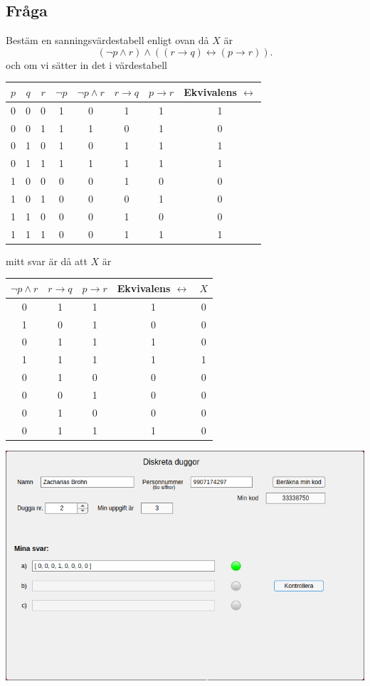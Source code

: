 \documentclass[a4paper,12pt]{article}
\begin{document}
\subsection*{Fråga}
Bestäm en sanningsvärdestabell enligt ovan då $X$ är
\begin{displaymath}
    \left(\neg p \wedge r\right) \wedge \left(\left(r \rightarrow q\right) \leftrightarrow \left(p \rightarrow r\right)\right).
\end{displaymath}
och om vi sätter in det i värdestabell
\begin{center}
\begin{tabular}{ ccc | c | ccc | c }
    $p$ & $q$ & $r$ & $\neg p$ & $\neg p \wedge r$ & $r \rightarrow q$ & $p
    \rightarrow r$ & Ekvivalens $\leftrightarrow$ \\ 
    \hline
    0 & 0 & 0 & 1 & 0 & 1 & 1 & 1 \\ 
    0 & 0 & 1 & 1 & 1 & 0 & 1 & 0 \\ 
    0 & 1 & 0 & 1 & 0 & 1 & 1 & 1 \\ 
    0 & 1 & 1 & 1 & 1 & 1 & 1 & 1 \\ 
    1 & 0 & 0 & 0 & 0 & 1 & 0 & 0 \\ 
    1 & 0 & 1 & 0 & 0 & 0 & 1 & 0 \\ 
    1 & 1 & 0 & 0 & 0 & 1 & 0 & 0 \\ 
    1 & 1 & 1 & 0 & 0 & 1 & 1 & 1 \\ 
\end{tabular}
\end{center}
mitt svar är då att $X$ är
\begin{center}
\begin{tabular}{ cccc | c }
    $\neg p \wedge r$ & $r \rightarrow q$ & $p
    \rightarrow r$ & Ekvivalens $\leftrightarrow$ & $X$ \\ 
    \hline
    0 & 1 & 1 & 1 & 0 \\ 
    1 & 0 & 1 & 0 & 0 \\ 
    0 & 1 & 1 & 1 & 0 \\ 
    1 & 1 & 1 & 1 & 1 \\ 
    0 & 1 & 0 & 0 & 0 \\ 
    0 & 0 & 1 & 0 & 0 \\ 
    0 & 1 & 0 & 0 & 0 \\ 
    0 & 1 & 1 & 1 & 0 \\
\end{tabular}
\end{center}
\begin{center}
    \includegraphics[width=15cm]{iPpJZWB.png}
\end{center}
\end{document}
